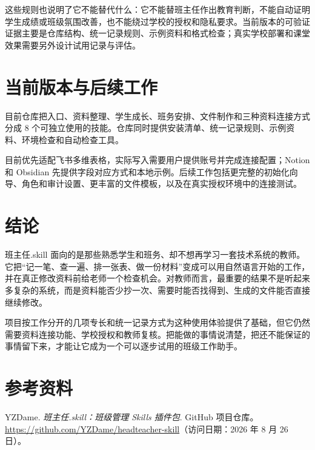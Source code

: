 \documentclass[11pt,a4paper,fontset=none]{ctexart}
\begin{document}
这些规则也说明了它不能替代什么：它不能替班主任作出教育判断，不能自动证明学生成绩或班级氛围改善，也不能绕过学校的授权和隐私要求。当前版本的可验证证据主要是仓库结构、统一记录规则、示例资料和格式检查；真实学校部署和课堂效果需要另外设计试用记录与评估。

\section{当前版本与后续工作}

目前仓库把入口、资料整理、学生成长、班务安排、文件制作和三种资料连接方式分成 8 个可独立使用的技能。仓库同时提供安装清单、统一记录规则、示例资料、环境检查和自动检查工具。

目前优先适配飞书多维表格，实际写入需要用户提供账号并完成连接配置；Notion 和 Obsidian 先提供字段对应方式和本地示例。后续工作包括更完整的初始化向导、角色和审计设置、更丰富的文件模板，以及在真实授权环境中的连接测试。

\section{结论}

班主任.skill 面向的是那些熟悉学生和班务、却不想再学习一套技术系统的教师。它把“记一笔、查一遍、排一张表、做一份材料”变成可以用自然语言开始的工作，并在真正修改资料前给老师一个检查机会。对教师而言，最重要的结果不是听起来多复杂的系统，而是资料能否少抄一次、需要时能否找得到、生成的文件能否直接继续修改。

项目按工作分开的几项专长和统一记录方式为这种使用体验提供了基础，但它仍然需要资料连接功能、学校授权和教师复核。把能做的事情说清楚，把还不能保证的事情留下来，才能让它成为一个可以逐步试用的班级工作助手。

\section*{参考资料}

\begin{enumerate}[label={[\arabic*]}]
  \item YZDame. \textit{班主任.skill：班级管理 Skills 插件包}. GitHub 项目仓库。\\
  \url{https://github.com/YZDame/headteacher-skill}（访问日期：2026 年 8 月 26 日）。
\end{enumerate}
\end{document}
